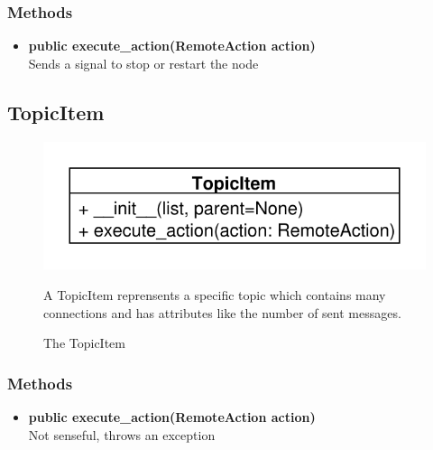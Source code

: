 \subsubsection{Methods}
\begin{itemize}
  \item \textbf{public execute\_action(RemoteAction action)}\\
  Sends a signal to stop or restart the node
\end{itemize}

\subsection{TopicItem}
\begin{figure}[htbp]
	\begin{minipage}[t]{7cm}
		\vspace{0pt}
		\centering
		\includegraphics[scale=0.6]{./diagram_pictures/TopicItem.pdf}
		\caption{The TopicItem}
	\end{minipage}
	\hfill
	\begin{minipage}[t]{8cm}
		\vspace{10pt}		
		A TopicItem reprensents a specific topic which contains many connections and has attributes like the number of sent messages.
	\end{minipage}
\end{figure} 
\subsubsection{Methods}
\begin{itemize}
  \item \textbf{public execute\_action(RemoteAction action)}\\ 
  Not senseful, throws an exception
\end{itemize}

